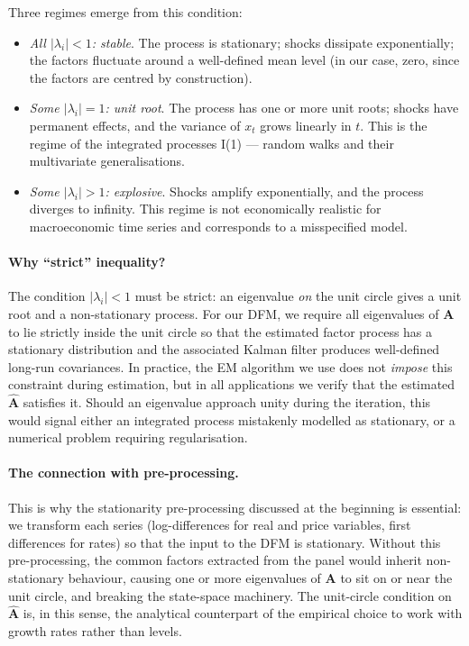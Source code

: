 \documentclass[11pt, a4paper, oneside]{article}
\begin{document}
Three regimes emerge from this condition:
\begin{itemize}[leftmargin=1.5em, itemsep=3pt]
    \item \emph{All $|\lambda_i| < 1$: stable}. The process is
          stationary; shocks dissipate exponentially; the factors
          fluctuate around a well-defined mean level (in our case,
          zero, since the factors are centred by construction).
    \item \emph{Some $|\lambda_i| = 1$: unit root}. The process has
          one or more unit roots; shocks have permanent effects, and
          the variance of $x_t$ grows linearly in $t$. This is the
          regime of the integrated processes I(1) — random walks and
          their multivariate generalisations.
    \item \emph{Some $|\lambda_i| > 1$: explosive}. Shocks amplify
          exponentially, and the process diverges to infinity. This
          regime is not economically realistic for macroeconomic
          time series and corresponds to a misspecified model.
\end{itemize}

\paragraph{Why ``strict'' inequality?}
The condition $|\lambda_i| < 1$ must be strict: an eigenvalue
\emph{on} the unit circle gives a unit root and a non-stationary
process. For our DFM, we require all eigenvalues of $\mathbf{A}$ to
lie strictly inside the unit circle so that the estimated factor
process has a stationary distribution and the associated Kalman
filter produces well-defined long-run covariances. In practice, the
EM algorithm we use does not \emph{impose} this constraint during
estimation, but in all applications we verify that the estimated
$\widehat{\mathbf{A}}$ satisfies it. Should an eigenvalue approach
unity during the iteration, this would signal either an integrated
process mistakenly modelled as stationary, or a numerical problem
requiring regularisation.

\paragraph{The connection with pre-processing.}
This is why the stationarity pre-processing discussed at the beginning is essential: we transform each
series (log-differences for real and price variables, first differences
for rates) so that the input to the DFM is stationary. Without this
pre-processing, the common factors extracted from the panel would
inherit non-stationary behaviour, causing one or more eigenvalues of
$\mathbf{A}$ to sit on or near the unit circle, and breaking the
state-space machinery. The unit-circle condition on
$\widehat{\mathbf{A}}$ is, in this sense, the analytical counterpart
of the empirical choice to work with growth rates rather than levels.
\end{document}
